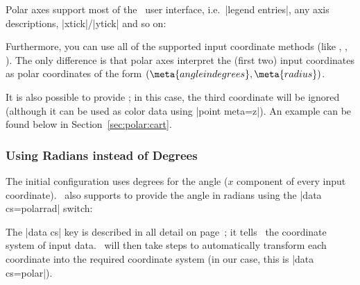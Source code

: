 {Polar axes support most of the \PGFPlots\ user interface, i.e.\ |legend entries|, any axis descriptions, |xtick|/|ytick| and so on:
\begin{codeexample}[]
\end{codeexample}
\noindent Furthermore, you can use all of the supported input coordinate methods (like , , ). The only difference is that polar axes interpret the (first two) input coordinates as polar coordinates of the form $(\meta{angle in degrees},\meta{radius})$.

It is also possible to provide ; in this case, the third coordinate will be ignored (although it can be used as color data using |point meta=z|). An example can be found below in Section~\ref{sec:polar:cart}.


\subsubsection{Using Radians instead of Degrees}
The initial configuration uses degrees for the angle ($x$ component of every input coordinate). \PGFPlots\ also supports to provide the angle in radians using the |data cs=polarrad| switch:
\begin{codeexample}[]
\end{codeexample}
The |data cs| key is described in all detail on page~\pageref{key:data:cs}; it tells \PGFPlots\ the coordinate system of input data. \PGFPlots\ will then take steps to automatically transform each coordinate into the required coordinate system (in our case, this is |data cs=polar|).

}
